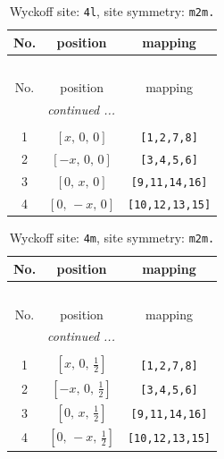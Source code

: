 \documentclass[fleqn,8pt]{jsarticle}
\begin{document}
\renewcommand{\arraystretch}{1.2}
\begin{longtable}{ccc}
\caption{Wyckoff site: {\tt 4l}, site symmetry: {\tt m2m.}}
 \\
 \hline \hline
No. & position & mapping \\ \hline \endfirsthead

\multicolumn{2}{l}{\tablename\ \thetable{}} \\
 \hline \hline
No. & position & mapping \\ \hline \endhead

 \hline \hline
\multicolumn{2}{r}{\footnotesize\it continued ...} \\ \endfoot

 \hline \hline
\multicolumn{2}{r}{} \\ \endlastfoot

1 & $\left[ x,\, 0,\, 0 \right]$ & {\tt [1,2,7,8]} \\ \hline
2 & $\left[ - x,\, 0,\, 0 \right]$ & {\tt [3,4,5,6]} \\ \hline
3 & $\left[ 0,\, x,\, 0 \right]$ & {\tt [9,11,14,16]} \\ \hline
4 & $\left[ 0,\, - x,\, 0 \right]$ & {\tt [10,12,13,15]} \\
\end{longtable}
\renewcommand{\arraystretch}{1.2}
\begin{longtable}{ccc}
\caption{Wyckoff site: {\tt 4m}, site symmetry: {\tt m2m.}}
 \\
 \hline \hline
No. & position & mapping \\ \hline \endfirsthead

\multicolumn{2}{l}{\tablename\ \thetable{}} \\
 \hline \hline
No. & position & mapping \\ \hline \endhead

 \hline \hline
\multicolumn{2}{r}{\footnotesize\it continued ...} \\ \endfoot

 \hline \hline
\multicolumn{2}{r}{} \\ \endlastfoot

1 & $\left[ x,\, 0,\, \frac{1}{2} \right]$ & {\tt [1,2,7,8]} \\ \hline
2 & $\left[ - x,\, 0,\, \frac{1}{2} \right]$ & {\tt [3,4,5,6]} \\ \hline
3 & $\left[ 0,\, x,\, \frac{1}{2} \right]$ & {\tt [9,11,14,16]} \\ \hline
4 & $\left[ 0,\, - x,\, \frac{1}{2} \right]$ & {\tt [10,12,13,15]} \\
\end{longtable}
\end{document}
